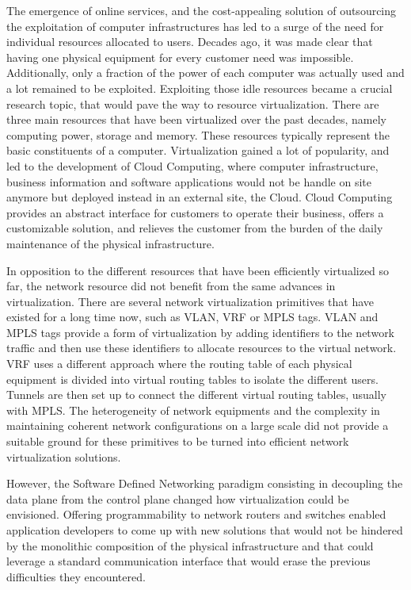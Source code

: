The emergence of online services, and the cost-appealing solution of outsourcing the exploitation of computer infrastructures has led to a surge of the need for individual resources allocated to users. Decades ago, it was made clear that having one physical equipment for every customer need was impossible. Additionally, only a fraction of the power of each computer was actually used and a lot remained to be exploited.
Exploiting those idle resources became a crucial research topic, that would pave the way to resource virtualization. 
There are three main resources that have been virtualized over the past decades, namely computing power, storage and memory.
These resources typically represent the basic constituents of a computer.
Virtualization gained a lot of popularity, and led to the development of Cloud Computing, where computer infrastructure, business information and software applications would not be handle on site anymore but deployed instead in an external site, \ie the Cloud. 
Cloud Computing provides an abstract interface for customers to operate their business, offers a customizable solution, and relieves the customer from the burden of the daily maintenance of the physical infrastructure.

In opposition to the different resources that have been efficiently virtualized so far, the network resource did not benefit from the same advances in virtualization.
There are several network virtualization primitives that have existed for a long time now, such as VLAN, VRF or MPLS tags. VLAN and MPLS tags provide a form of virtualization by adding identifiers to the network traffic and then use these identifiers to allocate resources to the virtual network. VRF uses a different approach where the routing table of each physical equipment is divided into virtual routing tables to isolate the different users. Tunnels are then set up to connect the different virtual routing tables, usually with MPLS.
The heterogeneity of network equipments and the complexity in maintaining coherent network configurations on a large scale did not provide a suitable ground for these primitives to be turned into efficient network virtualization solutions.

However, the Software Defined Networking paradigm consisting in decoupling the data plane from the control plane changed how virtualization could be envisioned. Offering programmability to network routers and switches enabled application developers to come up with new solutions that would not be hindered by the monolithic composition of the physical infrastructure and that could leverage a standard communication interface that would erase the previous difficulties they encountered.

